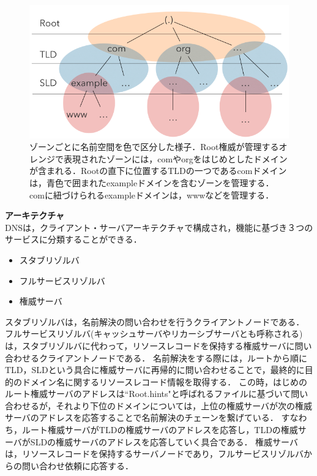 \begin{figure}[th]
 \centering
 \includegraphics[width=12.0cm]{figure/dns-architecture.png}
 \caption[ゾーンごとに分割された名前空間]{ゾーンごとに名前空間を色で区分した様子．Root権威が管理するオレンジで表現されたゾーンには，comやorgをはじめとしたドメインが含まれる．Rootの直下に位置するTLDの一つであるcomドメインは，青色で囲まれたexampleドメインを含むゾーンを管理する．comに紐づけられるexampleドメインは，wwwなどを管理する．}
 \label{fig:dns-architecture}
\end{figure}

\textbf{アーキテクチャ}\\
DNSは，クライアント・サーバアーキテクチャで構成され，機能に基づき３つのサービスに分類することができる．
\begin{itemize}
 \item スタブリゾルバ
 \vspace{-3mm}
 \item フルサービスリゾルバ
 \vspace{-3mm}
 \item 権威サーバ
\end{itemize}

スタブリゾルバは，名前解決の問い合わせを行うクライアントノードである．
フルサービスリゾルバ(キャッシュサーバやリカーシブサーバとも呼称される)は，スタブリゾルバに代わって，リソースレコードを保持する権威サーバに問い合わせるクライアントノードである．
名前解決をする際には，ルートから順にTLD，SLDという具合に権威サーバに再帰的に問い合わせることで，最終的に目的のドメイン名に関するリソースレコード情報を取得する．
この時，はじめのルート権威サーバのアドレスは``Root.hints"と呼ばれるファイルに基づいて問い合わせるが，それより下位のドメインについては，上位の権威サーバが次の権威サーバのアドレスを応答することで名前解決のチェーンを繋げている．
すなわち，ルート権威サーバがTLDの権威サーバのアドレスを応答し，TLDの権威サーバがSLDの権威サーバのアドレスを応答していく具合である．
権威サーバは，リソースレコードを保持するサーバノードであり，フルサービスリゾルバからの問い合わせ依頼に応答する．


